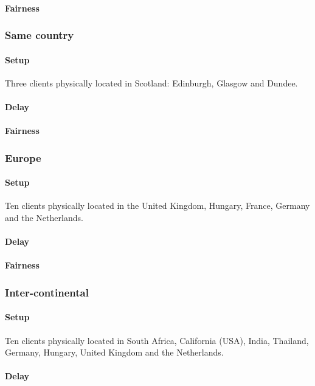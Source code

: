 \documentclass[12pt]{article}
\begin{document}
\paragraph{Fairness}

\subsubsection{Same country}
\paragraph{Setup}
Three clients physically located in Scotland: Edinburgh, Glasgow and Dundee.
\paragraph{Delay}
\paragraph{Fairness}

\subsubsection{Europe}
\paragraph{Setup}
Ten clients physically located in the United Kingdom, Hungary, France, Germany and the Netherlands.
\paragraph{Delay}
\paragraph{Fairness}

\subsubsection{Inter-continental}
\paragraph{Setup}
Ten clients physically located in South Africa, California (USA), India, Thailand, Germany, Hungary, United Kingdom and the Netherlands.
\paragraph{Delay}
\end{document}

